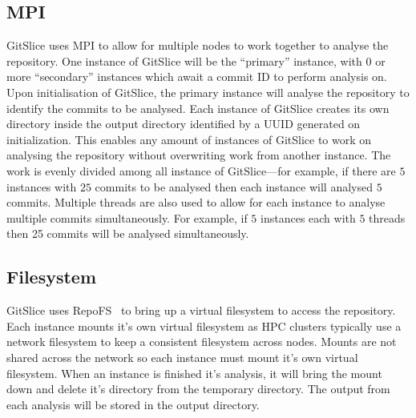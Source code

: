 \subsection{MPI}
\label{subsec:mpi}

GitSlice uses MPI to allow for multiple nodes to work together to analyse the repository.
One instance of GitSlice will be the ``primary'' instance, with $ 0 $ or more ``secondary'' instances which await a commit ID to perform analysis on.
Upon initialisation of GitSlice, the primary instance will analyse the repository to identify the commits to be analysed.
Each instance of GitSlice creates its own directory inside the output directory identified by a UUID generated on initialization.
This enables any amount of instances of GitSlice to work on analysing the repository without overwriting work from another instance.
The work is evenly divided among all instance of GitSlice---for example, if there are $ 5 $ instances with $ 25 $ commits to be analysed then each instance will analysed $ 5 $ commits.
Multiple threads are also used to allow for each instance to analyse multiple commits simultaneously.
For example, if $ 5 $ instances each with $ 5 $ threads then 25 commits will be analysed simultaneously.

\subsection{Filesystem}
\label{subsec:filesystem}

GitSlice uses RepoFS~\cite{repofs} to bring up a virtual filesystem to access the repository.
Each instance mounts it's own virtual filesystem as HPC clusters typically use a network filesystem to keep a consistent filesystem across nodes.
Mounts are not shared across the network so each instance must mount it's own virtual filesystem.
When an instance is finished it's analysis, it will bring the mount down and delete it's directory from the temporary directory.
The output from each analysis will be stored in the output directory.
